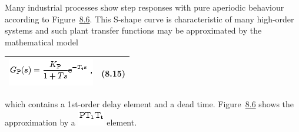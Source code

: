 \documentclass[]{article}
\begin{document}
Many industrial processes show step responses with pure aperiodic
\protect\hypertarget{16229}{}{}behaviour according to
Figure~\href{http://www.atp.ruhr-uni-bochum.de/rt1/syscontrol/node64.html\#fig:8.2.7}{8.6}.
This S-shape curve is characteristic of many high-order systems and such
plant transfer functions may be approximated by the
\protect\hypertarget{16231}{}{}mathematical model

\protect\hypertarget{eq:8.2.32}{}{}

\begin{longtable}[]{@{}ll@{}}
\toprule
\includegraphics[width=1.48958in,height=0.46875in]{./Empirical tuning rules according to Ziegler and Nichols_files/img1239.png}
& (8.15)\tabularnewline
\bottomrule
\end{longtable}

which contains a 1st-order delay element and a
\protect\hypertarget{16239}{}{}dead time.
Figure~\href{http://www.atp.ruhr-uni-bochum.de/rt1/syscontrol/node64.html\#fig:8.2.7}{8.6}
shows the \protect\hypertarget{16438}{}{}approximation by a
\protect\hypertarget{16439}{}{}
\includegraphics[width=0.45833in,height=0.27083in]{./Empirical tuning rules according to Ziegler and Nichols_files/img1241.png}
element.

\protect\hypertarget{fig:8.2.7}{}{}\protect\hypertarget{16440}{}{}
\end{document}
